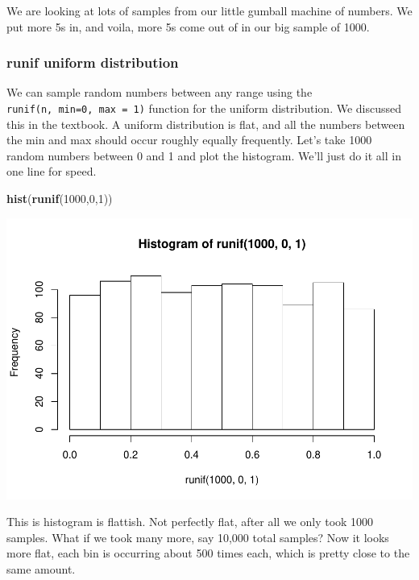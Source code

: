 \documentclass[]{book}
\newenvironment{Shaded}{\begin{snugshade}}{\end{snugshade}}
\newcommand{\KeywordTok}[1]{\textcolor[rgb]{0.13,0.29,0.53}{\textbf{#1}}}
\newcommand{\DecValTok}[1]{\textcolor[rgb]{0.00,0.00,0.81}{#1}}
\newcommand{\NormalTok}[1]{#1}
\begin{document}
We are looking at lots of samples from our little gumball machine of
numbers. We put more 5s in, and voila, more 5s come out of in our big
sample of 1000.

\subsubsection{runif uniform
distribution}\label{runif-uniform-distribution}

We can sample random numbers between any range using the
\texttt{runif(n,\ min=0,\ max\ =\ 1)} function for the uniform
distribution. We discussed this in the textbook. A uniform distribution
is flat, and all the numbers between the min and max should occur
roughly equally frequently. Let's take 1000 random numbers between 0 and
1 and plot the histogram. We'll just do it all in one line for speed.

\begin{Shaded}
\begin{Highlighting}[]
\KeywordTok{hist}\NormalTok{(}\KeywordTok{runif}\NormalTok{(}\DecValTok{1000}\NormalTok{,}\DecValTok{0}\NormalTok{,}\DecValTok{1}\NormalTok{))}
\end{Highlighting}
\end{Shaded}

\includegraphics{Statistics_Lab_files/figure-latex/unnamed-chunk-108-1.pdf}

This is histogram is flattish. Not perfectly flat, after all we only
took 1000 samples. What if we took many more, say 10,000 total samples?
Now it looks more flat, each bin is occurring about 500 times each,
which is pretty close to the same amount.
\end{document}
